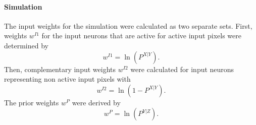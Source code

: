 \paragraph{Simulation}
The input weights for the simulation were calculated as two separate sets. First, weights $w^{I1}$ for the input neurons that are active for active input pixels were determined by 
\begin{equation}
\label{eqn:1DWeights}
w^{I1} = \ln(P^{X|Y}).
\end{equation}
Then, complementary input weights $w^{I2}$ were calculated for  input neurons representing non active input pixels with
\begin{equation}
\label{eqn:1DWeightsComplementary}
w^{I2} = \ln(1 - P^{X|Y}).
\end{equation} 
The prior weights $w^P$ were derived by 
\begin{equation}
\label{eqn:1DWeightsPrior}
w^P = \ln(P^{Y|Z}).
\end{equation}


